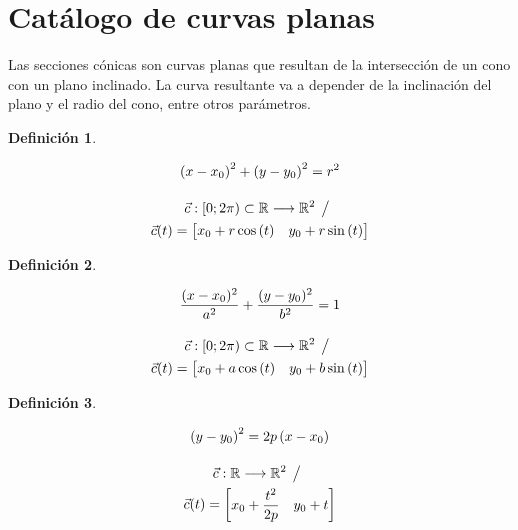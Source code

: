 \documentclass[a5paper,12pt,twoside]{book}
\newtheorem{defn}{{Definición}}[chapter]
\begin{document}
\section{Catálogo de curvas planas}


Las secciones cónicas son curvas planas que resultan de la intersección de un cono con un plano inclinado. La curva resultante va a depender de la inclinación del plano y el radio del cono, entre otros parámetros.

\begin{mdframed}[style=MyFrame1]
    \begin{defn}
    \end{defn}
    \begin{gather*}
        \left(x-x_0\right)^2 + \left(y-y_0\right)^2 = r^2
        \\[1em]
        \Vec{c}:[0;2 \pi) \subset \mathbb{R} \longrightarrow \mathbb{R}^2 \hspace{1ex} \big/ \hspace{1ex}
        \\
        \Vec{c}(t)= \begin{bmatrix} x_0 + r \cos{(t)} & y_0 + r \sin{(t)} \end{bmatrix}
    \end{gather*}
\end{mdframed}

\begin{mdframed}[style=MyFrame1]
    \begin{defn}
    \end{defn}
    \begin{gather*}
        \frac{(x-x_0)^2}{a^2}+\dfrac{(y-y_0)^2}{b^2}=1
        \\[1em]
        \Vec{c}:[0;2 \pi) \subset \mathbb{R} \longrightarrow \mathbb{R}^2 \hspace{1ex} \big/ \hspace{1ex}
        \\
        \Vec{c}(t)= \begin{bmatrix} x_0 + a\cos{(t)} & y_0 + b\sin{(t)} \end{bmatrix}
    \end{gather*}
\end{mdframed}

\begin{mdframed}[style=MyFrame1]
    \begin{defn}
    \end{defn}
    \begin{gather*}
        \left(y-y_0\right)^2 = 2p\left(x-x_0\right)
        \\[1em]
        \Vec{c}:\mathbb{R} \longrightarrow \mathbb{R}^2 \hspace{1ex} \big/ \hspace{1ex}
        \\
        \Vec{c}(t) = \begin{bmatrix} x_0 + \dfrac{t^2}{2p} & y_0 + t \end{bmatrix}
    \end{gather*}
\end{mdframed}
\end{document}
